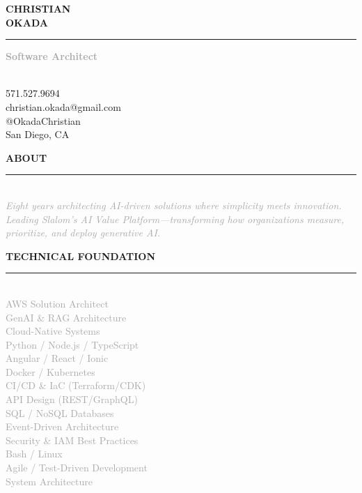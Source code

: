 \documentclass[10pt,letterpaper]{article}
\newcommand{\sidebarheader}[1]{%
    \vspace{6pt}
    {\headingfont\small\textcolor{accent}{\MakeUppercase{\textbf{#1}}}}
    \vspace{1pt}
    \par\noindent\textcolor{accent}{\rule{\linewidth}{1.5pt}}
    \vspace{2pt}
}
\begin{document}
\setlength{\voffset}{-.085in}
\noindent\colorbox{sidebarBg}{%
\begin{minipage}[t][10.885in][t]{2.7in}
\vspace{0.3in}
\hspace{0.3in}
\begin{minipage}{2.1in}
\raggedright

{\displayfont\fontsize{24}{28}\selectfont\textcolor{primary}{\textbf{CHRISTIAN}}}\\[-2pt]
{\displayfont\fontsize{24}{28}\selectfont\textcolor{accent}{\textbf{OKADA}}}

\vspace{4pt}
\noindent\textcolor{accent}{\rule{1.8in}{2.5pt}}
\vspace{6pt}

{\headingfont\small\textcolor{darkgray}{\textbf{Software Architect}}}

\vspace{6pt}

{\footnotesize\textcolor{mediumgray}{\\[-6pt]
571.527.9694\\[3pt]
christian.okada@gmail.com\\[3pt]
@OkadaChristian\\[3pt]
San Diego, CA\\[3pt]
}}

\sidebarheader{About}
{\footnotesize\textcolor{darkgray}{\\[-6pt]\itshape Eight years architecting AI-driven solutions where simplicity meets innovation. Leading Slalom's AI Value Platform—transforming how organizations measure, prioritize, and deploy generative AI.}}

\sidebarheader{Technical Foundation}
{\scriptsize\textcolor{darkgray}{\\[-6pt]
AWS Solution Architect\\[3pt]
GenAI \& RAG Architecture\\[3pt]
Cloud-Native Systems\\[3pt]
Python / Node.js / TypeScript\\[3pt]
Angular / React / Ionic\\[3pt]
Docker / Kubernetes\\[3pt]
CI/CD \& IaC (Terraform/CDK)\\[3pt]
API Design (REST/GraphQL)\\[3pt]
SQL / NoSQL Databases\\[3pt]
Event-Driven Architecture\\[3pt]
Security \& IAM Best Practices\\[3pt]
Bash / Linux\\[3pt]
Agile / Test-Driven Development\\[3pt]
System Architecture\\[3pt]
}}


\end{minipage}
\end{minipage}}
\end{document}
